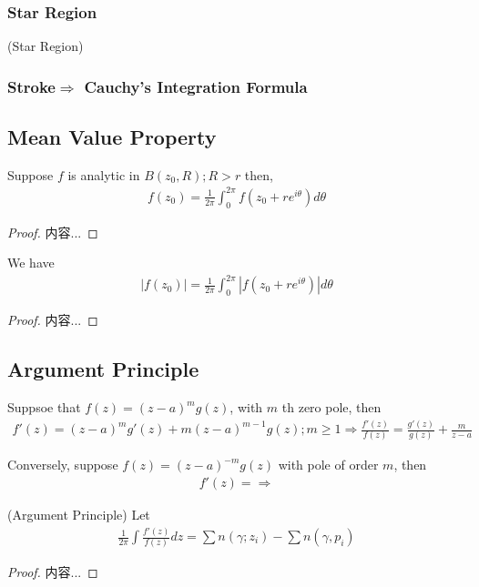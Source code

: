 \documentclass[Total.tex]{subfiles}
\begin{document}
				\subsubsection{Star Region}
					\begin{Def}
						(Star Region) 
					\end{Def}
				\subsubsection{Stroke$\Rightarrow$ Cauchy's Integration Formula}
			\subsection{Mean Value Property}
				\begin{proposition}
					Suppose $f$ is analytic in $B(z_0,R);R>r$ then,
					\begin{gather*}
						f(z_0)=\frac{1}{2\pi} \int_0^{2\pi} f(z_0+re^{i\theta})d\theta
					\end{gather*}
				\end{proposition}
				\begin{proof}
					内容...
				\end{proof}
				
				\begin{corollary}
					We have
					\begin{gather*}
						|f(z_0)|=\frac{1}{2\pi} \int_0^{2\pi}  |f(z_0+re^{i\theta})|d\theta
					\end{gather*}
				\end{corollary}
				\begin{proof}
					内容...
				\end{proof}
			\subsection{Argument Principle}
			
				Suppsoe that $f(z)=(z-a)^mg(z)$, with $m$ th zero pole, then
				\begin{gather*}
					f'(z)= (z-a)^mg'(z)+m(z-a)^{m-1}g(z);m\geq 1\Rightarrow \frac{f'(z)}{f(z)}=\frac{g'(z)}{g(z)}+\frac{m}{z-a} 
				\end{gather*}
				
				Conversely, suppose $f(z)=(z-a)^{-m}g(z)$ with pole of order $m$, then
				\begin{gather*}
					f'(z)=\Rightarrow 
				\end{gather*}
				
				\begin{theorem}
					(Argument Principle) Let 
					\begin{gather*}
						\frac{1}{2\pi}\int\frac{f'(z)}{f(z)}dz=\sum n(\gamma;z_i)-\sum n(\gamma,p_i)
					\end{gather*}
				\end{theorem}
				\begin{proof}
					内容...
				\end{proof}
\end{document}
